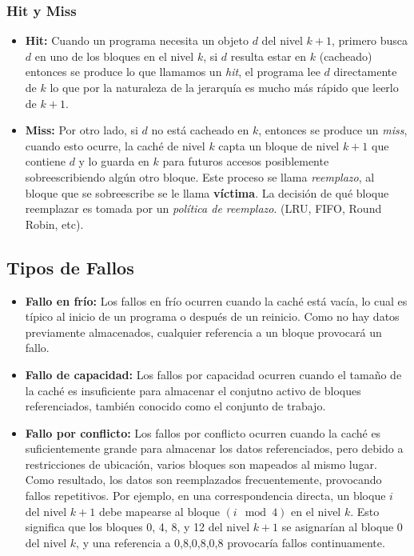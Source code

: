 \subsubsection{Hit y Miss}
\begin{itemize}
    \item \textbf{Hit:} Cuando un programa necesita un objeto $d$ del nivel $k + 1$, primero busca $d$ en uno de los bloques en el nivel $k$, si $d$ resulta
    estar en $k$ (cacheado) entonces se produce lo que llamamos un \textit{hit}, el programa lee $d$ directamente de $k$ lo que por 
    la naturaleza de la jerarquía es mucho más rápido que leerlo de $k + 1$.
\item \textbf{Miss:} Por otro lado, si $d$ no está cacheado en $k$, entonces se produce un \textit{miss}, cuando esto ocurre, 
    la caché de nivel $k$ capta un bloque de nivel $k + 1$ que contiene $d$ y lo guarda en $k$ para futuros accesos posiblemente
    sobreescribiendo algún otro bloque. Este proceso se llama \textit{reemplazo}, al bloque que se sobreescribe se le llama \textbf{víctima}.
    La decisión de qué bloque reemplazar es tomada por un \textit{política de reemplazo}. (LRU, FIFO, Round Robin, etc).
\end{itemize}

\subsection{Tipos de Fallos}
\begin{itemize}
    \item \textbf{Fallo en frío:}
        Los fallos en frío ocurren cuando la caché está vacía, lo cual es típico al inicio de un programa o después de un reinicio. Como no hay datos previamente almacenados, cualquier referencia a un bloque provocará un fallo. 
    \item \textbf{Fallo de capacidad:} Los fallos por capacidad ocurren cuando el tamaño de la caché es insuficiente para almacenar el conjutno activo de bloques referenciados, también conocido como el conjunto de trabajo.
    \item \textbf{Fallo por conflicto:} Los fallos por conflicto ocurren cuando la caché es suficientemente grande para almacenar los datos referenciados, pero debido a restricciones de ubicación, varios bloques son mapeados al mismo lugar. Como resultado, los datos son reemplazados frecuentemente, provocando fallos repetitivos.
        Por ejemplo, en una correspondencia directa, un bloque \(i\) del nivel \(k+1\) debe mapearse al bloque \((i \mod 4)\) en el nivel \(k\). Esto significa que los bloques 0, 4, 8, y 12 del nivel \(k+1\) se asignarían al bloque 0 del nivel \(k\), y una referencia a 0,8,0,8,0,8 provocaría fallos continuamente.
\end{itemize}

